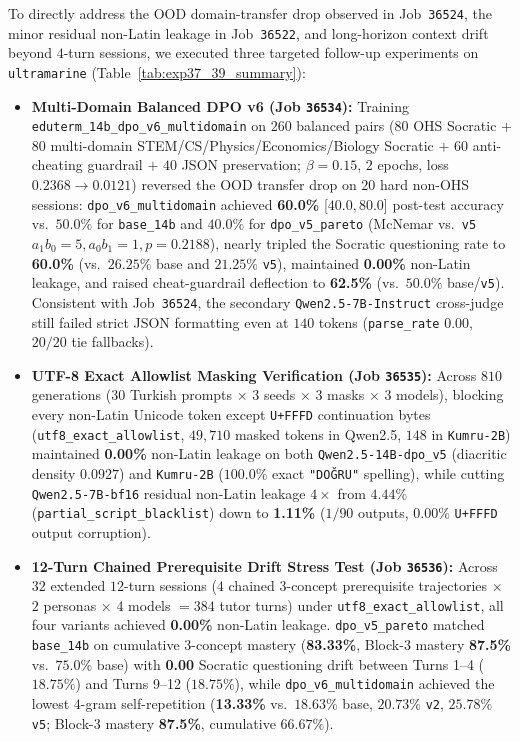 \documentclass[a4paper,12pt]{report}
\begin{document}
To directly address the OOD domain-transfer drop observed in Job~\texttt{36524}, the minor residual non-Latin leakage in Job~\texttt{36522}, and long-horizon context drift beyond $4$-turn sessions, we executed three targeted follow-up experiments on \texttt{ultramarine} (Table~\ref{tab:exp37_39_summary}):
\begin{itemize}
    \item \textbf{Multi-Domain Balanced DPO v6 (Job \texttt{36534}):} Training \texttt{eduterm\_14b\_dpo\_v6\_multidomain} on $260$ balanced pairs ($80$ OHS Socratic $+$ $80$ multi-domain STEM/CS/Physics/Economics/Biology Socratic $+$ $60$ anti-cheating guardrail $+$ $40$ JSON preservation; $\beta=0.15$, $2$ epochs, loss $0.2368 \to 0.0121$) reversed the OOD transfer drop on $20$ hard non-OHS sessions: \texttt{dpo\_v6\_multidomain} achieved \textbf{60.0\%} [$40.0, 80.0$] post-test accuracy vs.\ $50.0\%$ for \texttt{base\_14b} and $40.0\%$ for \texttt{dpo\_v5\_pareto} (McNemar vs.\ \texttt{v5} $a_1b_0=5, a_0b_1=1, p=0.2188$), nearly tripled the Socratic questioning rate to \textbf{60.0\%} (vs.\ $26.25\%$ base and $21.25\%$ \texttt{v5}), maintained \textbf{0.00\%} non-Latin leakage, and raised cheat-guardrail deflection to \textbf{62.5\%} (vs.\ $50.0\%$ base/\texttt{v5}). Consistent with Job~\texttt{36524}, the secondary \texttt{Qwen2.5-7B-Instruct} cross-judge still failed strict JSON formatting even at $140$ tokens (\texttt{parse\_rate} $0.00$, $20/20$ tie fallbacks).
    \item \textbf{UTF-8 Exact Allowlist Masking Verification (Job \texttt{36535}):} Across $810$ generations ($30$ Turkish prompts $\times$ $3$ seeds $\times$ $3$ masks $\times$ $3$ models), blocking every non-Latin Unicode token except \texttt{U+FFFD} continuation bytes (\texttt{utf8\_exact\_allowlist}, $49{,}710$ masked tokens in Qwen2.5, $148$ in \texttt{Kumru-2B}) maintained \textbf{0.00\%} non-Latin leakage on both \texttt{Qwen2.5-14B-dpo\_v5} (diacritic density $0.0927$) and \texttt{Kumru-2B} ($100.0\%$ exact \texttt{"DO\u{G}RU"} spelling), while cutting \texttt{Qwen2.5-7B-bf16} residual non-Latin leakage $4\times$ from $4.44\%$ (\texttt{partial\_script\_blacklist}) down to \textbf{1.11\%} ($1/90$ outputs, $0.00\%$ \texttt{U+FFFD} output corruption).
    \item \textbf{12-Turn Chained Prerequisite Drift Stress Test (Job \texttt{36536}):} Across $32$ extended $12$-turn sessions ($4$ chained $3$-concept prerequisite trajectories $\times$ $2$ personas $\times$ $4$ models $= 384$ tutor turns) under \texttt{utf8\_exact\_allowlist}, all four variants achieved \textbf{0.00\%} non-Latin leakage. \texttt{dpo\_v5\_pareto} matched \texttt{base\_14b} on cumulative $3$-concept mastery (\textbf{83.33\%}, Block-3 mastery \textbf{87.5\%} vs.\ $75.0\%$ base) with \textbf{0.00} Socratic questioning drift between Turns 1--4 ($18.75\%$) and Turns 9--12 ($18.75\%$), while \texttt{dpo\_v6\_multidomain} achieved the lowest $4$-gram self-repetition (\textbf{13.33\%} vs.\ $18.63\%$ base, $20.73\%$ \texttt{v2}, $25.78\%$ \texttt{v5}; Block-3 mastery \textbf{87.5\%}, cumulative $66.67\%$).
\end{itemize}
\end{document}
